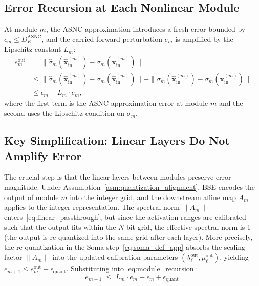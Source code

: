\documentclass{article}
\theoremstyle{plain}
\theoremstyle{definition}
\theoremstyle{remark}
\begin{document}
\subsection{Error Recursion at Each Nonlinear Module}

At module $m$, the ASNC approximation introduces a fresh error bounded by
$\epsilon_m \le D_K^{\mathrm{ASNC}}$, and the carried-forward perturbation
$e_m$ is amplified by the Lipschitz constant $L_m$:
\begin{align}
e_m^\mathrm{out}
&= \|\hat{\sigma}_m(\hat{\mathbf{x}}^{(m)}_\mathrm{in})
      - \sigma_m(\mathbf{x}^{(m)}_\mathrm{in})\| \nonumber \\
&\le \|\hat{\sigma}_m(\hat{\mathbf{x}}^{(m)}_\mathrm{in})
      - \sigma_m(\hat{\mathbf{x}}^{(m)}_\mathrm{in})\|
    + \|\sigma_m(\hat{\mathbf{x}}^{(m)}_\mathrm{in})
      - \sigma_m(\mathbf{x}^{(m)}_\mathrm{in})\| \nonumber \\
&\le \epsilon_m + L_m \cdot e_m, \label{eq:module_recursion}
\end{align}
where the first term is the ASNC approximation error at module $m$ and the second
uses the Lipschitz condition on $\sigma_m$.

\subsection{Key Simplification: Linear Layers Do Not Amplify Error}

The crucial step is that the linear layers between modules preserve error magnitude.
Under Assumption~\ref{asm:quantization_alignment}, BSE encodes the output of module
$m$ into the integer grid, and the downstream affine map $A_m$ applies to the integer
representation. The spectral norm $\|A_m\|$ enters~\eqref{eq:linear_passthrough},
but since the activation ranges are calibrated such that the output fits within the
$N$-bit grid, the effective spectral norm is 1 (the output is re-quantized into
the same grid after each layer). More precisely, the re-quantization in the Soma
step~\eqref{eq:soma_def_app} absorbs the scaling factor $\|A_m\|$ into the updated
calibration parameters $(\lambda_\ell^\mathrm{out}, \mu_\ell^\mathrm{out})$, yielding
$e_{m+1} \le e_m^\mathrm{out} + \epsilon_\mathrm{quant}$. Substituting into
\eqref{eq:module_recursion}:
\begin{equation}
\label{eq:recursion_simplified}
e_{m+1} \;\le\; L_m \cdot e_m + \epsilon_m + \epsilon_\mathrm{quant}.
\end{equation}
\end{document}
